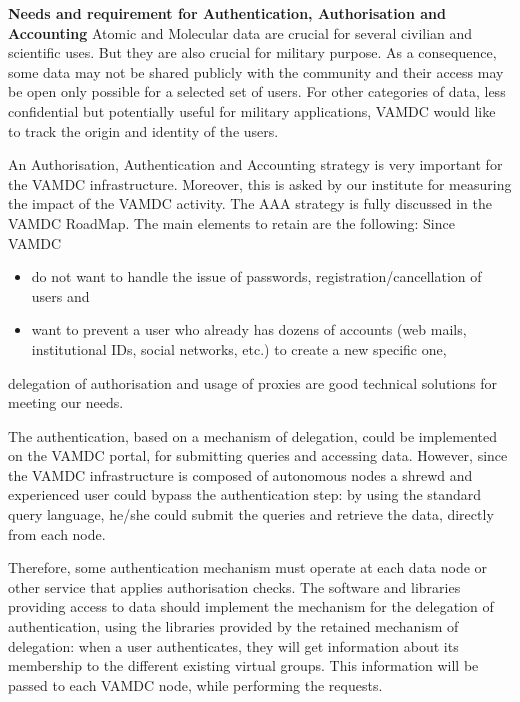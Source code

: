 \documentclass[fleqn,11pt]{wlscirep}
\begin{document}
{\textbf{Needs and requirement for Authentication, Authorisation and Accounting}
Atomic and Molecular data are crucial for several civilian and scientific uses. But they are also crucial for military purpose. As a consequence, some data may not be shared publicly with the community and their access may be open only possible for a selected set of users. For other categories of data, less confidential but potentially useful for military applications, VAMDC would like to track the origin and identity of the users.

An Authorisation, Authentication and Accounting strategy is very important for the VAMDC infrastructure.  Moreover, this is asked by our institute for measuring the impact of the VAMDC activity. The AAA strategy is fully discussed in the VAMDC RoadMap.  The main elements to retain are the following:
Since VAMDC
\begin{itemize}
\item do not want to handle the issue of passwords, registration/cancellation of users and
\item want to prevent a user who already has dozens of accounts (web mails, institutional IDs, social networks, etc.) to create a new specific one,
\end{itemize}
delegation of authorisation and usage of proxies are good technical solutions for meeting our needs.
 
The authentication, based on a mechanism of delegation, could be implemented on the VAMDC portal, for submitting queries and accessing data. However, since the VAMDC infrastructure is composed of autonomous nodes a shrewd and experienced user could bypass the authentication step: by using the standard query language, he/she could submit the queries and retrieve the data, directly from each node.

Therefore, some authentication mechanism must operate at each data node or other service that applies authorisation checks. The software and libraries providing access to data should implement the mechanism for the delegation of authentication, using the libraries provided by the retained mechanism of delegation: when a user authenticates, they will get information about its membership to the different existing virtual groups. This information will be passed to each VAMDC node, while performing the requests.

}
\end{document}
